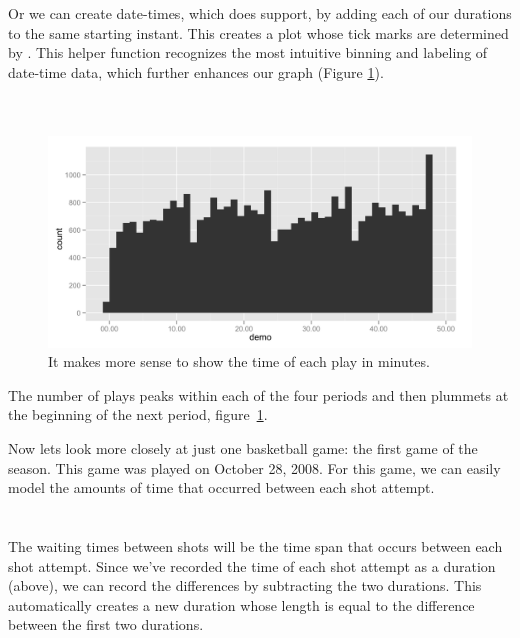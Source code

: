 \documentclass[article]{jss}
\begin{document}
Or we can create date-times, which  does support, by adding each of our durations to the same starting instant. This creates a plot whose tick marks are determined by . This helper function recognizes the most intuitive binning and labeling of date-time data, which further enhances our graph (Figure \ref{fig:plays2}).\\

\\
\\

\begin{figure}[htpb]
  \centering
  \includegraphics[width=\textwidth]{play-time-histogram2.png}        
  \caption{It makes more sense to show the time of each play in minutes.}
  \label{fig:plays2}
\end{figure}


The number of plays peaks within each of the four periods and then plummets at the beginning of the next period, figure~\ref{fig:plays2}.

Now lets look more closely at just one basketball game: the first game of the season. This game was played on October 28, 2008. For this game, we can easily model the amounts of time that occurred between each shot attempt.\\

\\
\\

The waiting times between shots will be the time span that occurs between each shot attempt. Since we've recorded the time of each shot attempt as a duration (above), we can record the differences by subtracting the two durations. This automatically creates a new duration whose length is equal to the difference between the first two durations.\\
\end{document}
